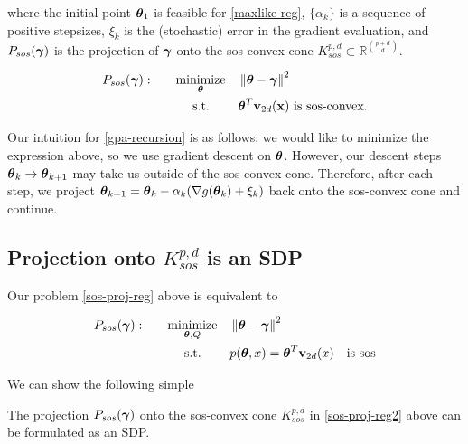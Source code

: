 \documentclass[11pt,reqno]{amsart}
\numberwithin{equation}{section}
\newcommand{\mr}{\mathbb{R}}
\begin{document}
where the initial point ${\boldsymbol\theta}_1$ is feasible for \eqref{maxlike-reg}, $\{\alpha_k\}$ is a sequence of positive stepsizes, $\xi_k$ is the (stochastic) error in the gradient evaluation, and $P_{sos}({\boldsymbol\gamma})$ is the projection of ${\boldsymbol\gamma}$ onto the sos-convex cone $K_{sos}^{p,d} \subset \mr^{\binom{p + d}{d}}$. 

\begin{equation} \label{sos-proj-reg}
\begin{aligned}
 P_{sos}({\boldsymbol\gamma}): \qquad & \underset{{\boldsymbol\theta}}{\text{minimize} }
& & \left\lVert {\boldsymbol\theta} - {\boldsymbol\gamma} \right\rVert^2 \\
& \text{\quad\ s.t.}
& & \text{${\boldsymbol\theta}^T {\bf v}_{2d}({\bf x})$ is sos-convex.}
\end{aligned}
\end{equation}

Our intuition for \eqref{gpa-recursion} is as follows: we would like to minimize the expression above, so we use gradient descent on ${\boldsymbol\theta}$. However, our descent steps ${\boldsymbol\theta}_k \rightarrow {\boldsymbol\theta}_{k + 1}$ may take us outside of the sos-convex cone. Therefore, after each step, we project ${\boldsymbol\theta}_{k + 1} = {\boldsymbol\theta}_k - \alpha_k(\nabla g({\boldsymbol\theta}_k) + \xi_k)$ back onto the sos-convex cone and continue. \\

\subsection{Projection onto $K_{sos}^{p,d}$ is an SDP} 
Our problem \eqref{sos-proj-reg} above is equivalent to

\begin{equation} \label{sos-proj-reg2}
\begin{aligned}
 P_{sos}({\boldsymbol\gamma}): \qquad & \underset{{\boldsymbol\theta}, Q}{\text{minimize} }
& & \left\lVert {\boldsymbol\theta} - {\boldsymbol\gamma} \right\rVert^2 \\
& \text{\quad\ s.t.}
& & p({\boldsymbol\theta}, x) = {\boldsymbol\theta}^T {\bf v}_{2d}(x) \quad \text{is sos} \\
\end{aligned}
\end{equation}

We can show the following simple\\

\begin{proposition} \label{sos-proj-reg-prop}
The projection $P_{sos}({\boldsymbol\gamma}) $ onto the sos-convex cone $K_{sos}^{p,d}$ in \eqref{sos-proj-reg2} above can be formulated as an SDP. 
\end{proposition}
\end{document}
